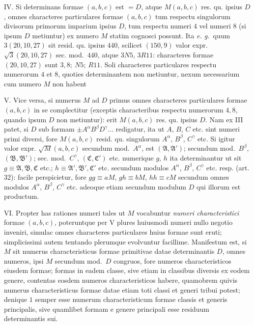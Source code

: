 IV. Si determinans formae $(a,b,c)$ est $=D$, atque $M(a,b,c)$ res. qu. ipsius $D$, omnes characteres particulares formae $(a,b,c)$ tum respectu singulorum divisorum primorum imparium ipsius $D$, tum respectu numeri $4$ vel numeri $8$ (si ipsum $D$ metiuntur) ex numero $M$ statim cognosci possunt. Ita \textit{e. g.}\ quum $3(20,10,27)$ sit resid. qu. ipsius $440$, scilicet $(150,9)$ valor expr. $\surd3(20,10,27)$ sec. mod.\ $440$, atque $3N5$, $3R11$: characteres formae $(20,10,27)$ sunt $3,8;\ N5;\ R11$. Soli characteres particulares respectu numerorum $4$ et $8$, quoties determinantem non metiuntur, nexum necessarium cum numero $M$ non habent

V. Vice versa, si numerus $M$ ad $D$ primus omnes characteres particulares formae $(a,b,c)$ in se complectitur (exceptis characteribus respectu numerorum $4,8$, quando ipsum $D$ non metiuntur): erit $M(a,b,c)$ res. qu. ipsius $D$. Nam ex III patet, si $D$ sub formam $\pm A^\alpha B^\beta D^\gamma\ldots$ redigatur, ita ut $A$, $B$, $C$ etc. sint numeri primi diversi, fore $M(a,b,c)$ resid. qu. singulorum $A^\alpha$, $B^\beta$, $C^\gamma$ etc. Si igitur valor expr. $\surd M(a,b,c)$ secundum mod.\ $A^\alpha$, est $(\mathfrak{A},\mathfrak{A}')$; secundum mod.\ $B^\beta$, $(\mathfrak{B},\mathfrak{B}')$; sec. mod.\ $C^\gamma$, $(\mathfrak{C},\mathfrak{C}')$ etc. numerique $g$, $h$ ita determinantur ut sit $g\equiv\mathfrak{A},\mathfrak{B},\mathfrak{C}$ etc.; $h\equiv\mathfrak{A}',\mathfrak{B}',\mathfrak{C}'$ etc. secundum modulos $A^\alpha$, $B^\beta$, $C^\gamma$ etc. resp. (art. 32): facile perspicietur, fore $gg\equiv aM$, $gh\equiv bM$, $hh\equiv cM$ secundum omnes modulos $A^\alpha$, $B^\beta$, $C^\gamma$ etc. adeoque etiam secundum modulum $D$ qui illorum est productum.

VI. Propter has rationes numeri tales ut $M$ vocabuntur \textit{numeri characteristici} formae $(a,b,c)$, poteruntque per V plures huiusmodi numeri nullo negotio inveniri, simulac omnes characteres particulares huius formae sunt eruti; simplicissimi autem tentando plerumque evolvuntur facillime. Manifestum est, si $M$ sit numerus characteristicus formae primitivae datae determinantis $D$, omnes numeros, ipsi $M$ secundum mod.\ $D$ congruos, fore numeros characteristicos eiusdem formae; formas in eadem classe, sive etiam in classibus diversis ex eodem genere, contentas eosdem numeros characteristicos habere, quamobrem quivis numerus
characteristicus formae datae etiam toti classi et generi tribui potest; denique $1$ semper esse numerum characteristicum formae classis et generis principalis, sive quamlibet formam e genere principali esse residuum determinantis sui.

